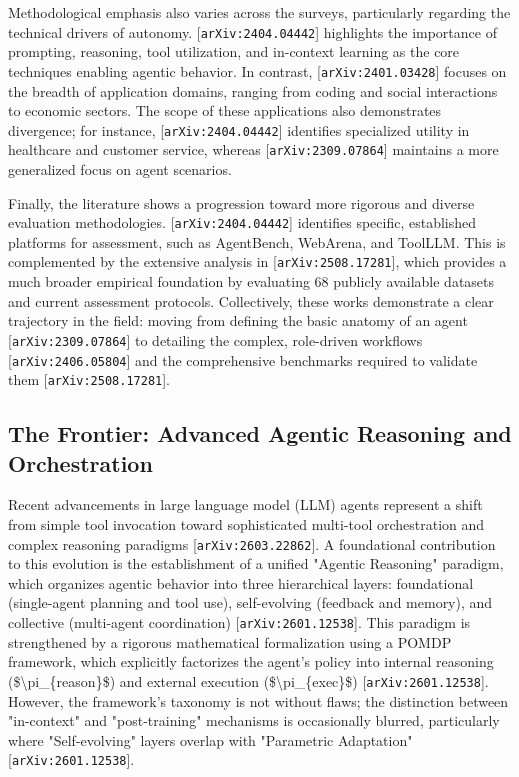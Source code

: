 \documentclass[11pt]{article}
\begin{document}
Methodological emphasis also varies across the surveys, particularly regarding the technical drivers of autonomy. [\texttt{arXiv:2404.04442}] highlights the importance of prompting, reasoning, tool utilization, and in-context learning as the core techniques enabling agentic behavior. In contrast, [\texttt{arXiv:2401.03428}] focuses on the breadth of application domains, ranging from coding and social interactions to economic sectors. The scope of these applications also demonstrates divergence; for instance, [\texttt{arXiv:2404.04442}] identifies specialized utility in healthcare and customer service, whereas [\texttt{arXiv:2309.07864}] maintains a more generalized focus on agent scenarios.

Finally, the literature shows a progression toward more rigorous and diverse evaluation methodologies. [\texttt{arXiv:2404.04442}] identifies specific, established platforms for assessment, such as AgentBench, WebArena, and ToolLLM. This is complemented by the extensive analysis in [\texttt{arXiv:2508.17281}], which provides a much broader empirical foundation by evaluating 68 publicly available datasets and current assessment protocols. Collectively, these works demonstrate a clear trajectory in the field: moving from defining the basic anatomy of an agent [\texttt{arXiv:2309.07864}] to detailing the complex, role-driven workflows [\texttt{arXiv:2406.05804}] and the comprehensive benchmarks required to validate them [\texttt{arXiv:2508.17281}].

\subsection{The Frontier: Advanced Agentic Reasoning and Orchestration}

Recent advancements in large language model (LLM) agents represent a shift from simple tool invocation toward sophisticated multi-tool orchestration and complex reasoning paradigms [\texttt{arXiv:2603.22862}]. A foundational contribution to this evolution is the establishment of a unified "Agentic Reasoning" paradigm, which organizes agentic behavior into three hierarchical layers: foundational (single-agent planning and tool use), self-evolving (feedback and memory), and collective (multi-agent coordination) [\texttt{arXiv:2601.12538}]. This paradigm is strengthened by a rigorous mathematical formalization using a POMDP framework, which explicitly factorizes the agent's policy into internal reasoning (\$\textbackslash{}pi\_\{reason\}\$) and external execution (\$\textbackslash{}pi\_\{exec\}\$) [\texttt{arXiv:2601.12538}]. However, the framework's taxonomy is not without flaws; the distinction between "in-context" and "post-training" mechanisms is occasionally blurred, particularly where "Self-evolving" layers overlap with "Parametric Adaptation" [\texttt{arXiv:2601.12538}].
\end{document}
